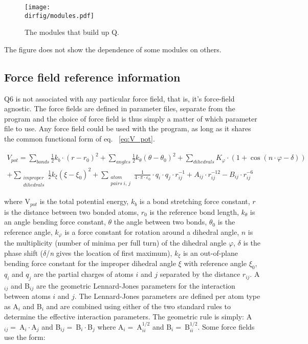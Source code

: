 \documentclass[a4paper,11pt]{article}
\newcommand{\dirfig}{./pictures}
\let\origref\ref
\def\ref#1{\unskip~\origref{#1}}
\begin{document}
\begin{figure}[h]
\centerline{\texttt{[image: \\dirfig/modules.pdf]}}
\caption{The modules that build up Q.} \label{fig:modules}
\end{figure}

The figure does not show the dependence of some modules on others.

\subsection{Force field reference information}
Q6 is  not associated with  any particular  force field, that  is, it's
force-field agnostic. The force fields are defined in parameter files,
separate from the program and the choice of force field is thus simply
a matter of which parameter file to use. Any force field could be used
with the program,  as long as it shares the  common functional form of
eq.  \ref{eq:V_pot}.

\begin{multline}
\label{eq:V_pot}
 V_{pot} =\sum\limits_{bonds} {\frac{1}{2}k_b \cdot \left( {r-r_0
} \right)^2} +\sum\limits_{angles} {\frac{1}{2}k_\theta \left(
{\theta -\theta_0} \right)^2} +\sum\limits_{dihedrals} {K_\varphi
\cdot \left( {1+\cos \left( {n\cdot \varphi -\delta } \right)}
\right)} \\
  +\sum\limits_{\substack{improper \\ dihedrals}}
{\frac{1}{2}k_\xi \left( {\xi -\xi _0} \right)^2}
+\sum\limits_{\substack{atom \\ pairs \; i , \, j}}
{\frac{1}{4\cdot \pi \cdot \varepsilon_0 } \cdot q_i \cdot q_j
\cdot r_{ij}^{-1} +A_{ij} \cdot r_{ij}^{-12} -B_{ij} \cdot
r_{ij}^{-6}}
\end{multline}

where V$_{pot}$ is the total potential energy, $k_{b}$ is a bond
stretching force constant, $r$ is the distance between two bonded
atoms, $r_{0}$ is the reference bond length, $k_{\theta }$ is an
angle bending force constant, $\theta$  the angle between two
bonds, $\theta _{0}$ is the reference angle, $k_{\varphi }$ is a
force constant for rotation around a dihedral angle, $n$ is the
multiplicity (number of minima per full turn) of the dihedral
angle $\varphi$, $\delta$  is the phase shift ($\delta$/\emph{n}
gives the location of first maximum), $k_{\xi }$ is an
out-of-plane bending force constant for the improper dihedral
angle $\xi$ with reference angle $\xi_{0}$, $q_{i}$ and $q_{j}$
are the partial charges of atoms $i$ and $j$ separated by the
distance $r_{ij}$. A$_{ij}$ and B$_{ij}$ are the geometric
Lennard-Jones parameters for the interaction between atoms $i$ and
$j$. The Lennard-Jones parameters are defined per atom type as
A$_{i}$ and B$_{i}$ and are combined using either of the two
standard rules to determine the effective interaction parameters.
The geometric rule is simply: A$_{ij}= \:$A$_{i}\cdot $A$_{j}$ and
B$_{ij}=\:$B$_{i}\cdot $B$_{j}$ where A$_{i}=\:$A$_{ii}^{1/2}$ and
B$_{i}=\:$B$_{ii}^{1/2}$. Some force fields use the form:\\
\end{document}
